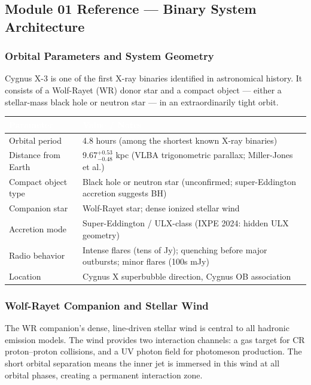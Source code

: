 \documentclass[11pt,letterpaper]{article}
\newcommand{\tableheader}[1]{\textbf{\sffamily\textcolor{white}{#1}}}
\begin{document}
\subsection{Module 01 Reference --- Binary System Architecture}

\subsubsection{Orbital Parameters and System Geometry}

Cygnus X-3 is one of the first X-ray binaries identified in astronomical history. It consists of a Wolf-Rayet (WR) donor star and a compact object --- either a stellar-mass black hole or neutron star --- in an extraordinarily tight orbit.

\begin{center}
\begin{tabularx}{\textwidth}{L{4.5cm}X}
\toprule
{}
\tableheader{Parameter} & \tableheader{Value / Notes} \\
\midrule
Orbital period & 4.8 hours (among the shortest known X-ray binaries) \\
Distance from Earth & 9.67$^{+0.53}_{-0.48}$ kpc (VLBA trigonometric parallax; Miller-Jones et al.) \\
Compact object type & Black hole or neutron star (unconfirmed; super-Eddington accretion suggests BH) \\
Companion star & Wolf-Rayet star; dense ionized stellar wind \\
Accretion mode & Super-Eddington / ULX-class (IXPE 2024: hidden ULX geometry) \\
Radio behavior & Intense flares (tens of Jy); quenching before major outbursts; minor flares (100s mJy) \\
Location & Cygnus X superbubble direction, Cygnus OB association \\
\bottomrule
\end{tabularx}
\end{center}

\subsubsection{Wolf-Rayet Companion and Stellar Wind}

The WR companion's dense, line-driven stellar wind is central to all hadronic emission models. The wind provides two interaction channels: a gas target for CR proton--proton collisions, and a UV photon field for photomeson production. The short orbital separation means the inner jet is immersed in this wind at all orbital phases, creating a permanent interaction zone.
\end{document}
